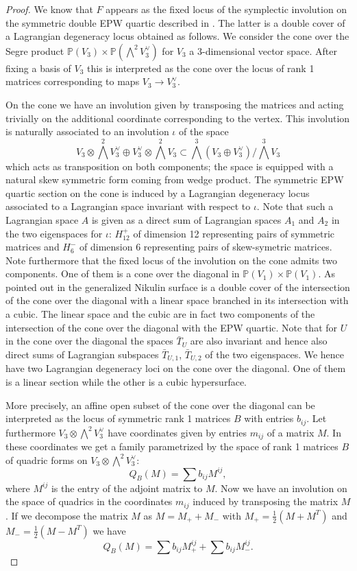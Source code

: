 \documentclass{amsart}
\theoremstyle{definition}
\numberwithin{equation}{section}
\numberwithin{equation}{section} \theoremstyle{definition}
\begin{document}
\begin{proof}
    We know that $F$ appears as the fixed locus of the symplectic involution on the symmetric double EPW quartic described in \cite[Section 5A]{CGKK}. The latter is a double cover of a Lagrangian degeneracy locus obtained as follows. We consider the cone over the Segre product $\mathbb P(V_3)\times \mathbb P(\bigwedge^2 V_3^\vee)$ for $V_3$ a $3$-dimensional vector space.  After fixing a basis of $V_3$ this is interpreted as the cone over the locus of rank 1 matrices corresponding to maps $V_3\to V_3^{\vee}$. %
    
    On the cone we have an involution given by transposing the matrices and acting trivially on the additional coordinate corresponding to the vertex. This involution is naturally associated to an involution $\iota$ of the space $$V_3\otimes \bigwedge^2 V_3^{\vee}\oplus V_3^{\vee}\otimes \bigwedge^2 V_3\subset \bigwedge^3 (V_3\oplus V_3^{\vee})/\bigwedge^3 V_3$$ which acts as transposition on both components; the space is equipped with a natural skew symmetric form coming from wedge product. 
    The symmetric EPW quartic section on the cone is induced by a Lagrangian degeneracy locus associated to a Lagrangian space invariant with respect to $\iota$. Note that such a Lagrangian space $A$ is given as a direct sum of Lagrangian spaces $A_1$ and $A_2$ in the two eigenspaces for $\iota$: $H^+_{12}$ of dimension 12 representing pairs of symmetric matrices and  $H^-_6$ of dimension 6 representing pairs of skew-symetric matrices. Note furthermore that the fixed locus of the involution on the cone  admits two components. 
    One of them is a cone over the diagonal in $\mathbb P(V_1)\times \mathbb P(V_1)$. As pointed out in \cite[Proposition 5.3]{CGKK} the generalized Nikulin surface is a double cover of the intersection of the cone over the diagonal with a linear space branched in its intersection with a cubic. The linear space and the cubic are in fact two components of the intersection of the cone over the diagonal with the EPW quartic. 
    Note that for $U$ in the cone over the diagonal the spaces $\bar T_U$ are also invariant and hence also direct sums of Lagrangian subspaces $\bar T_{U,1}$, $\bar T_{U,2}$  of the two eigenspaces. We hence have two Lagrangian degeneracy loci on the cone over the diagonal. One of them is a linear section while the other is a cubic hypersurface. 
    
    
    More precisely, an affine open subset of the cone over the diagonal can be interpreted as the locus of symmetric rank 1 matrices $B$ with entries $b_{ij}$.  Let furthermore $V_3\otimes \bigwedge^2 V_3^{\vee}$ have coordinates given by entries $m_{ij}$ of a matrix $M$.  
   In these coordinates we get a family parametrized by the space of rank 1 matrices $B$ of quadric forms on $V_3\otimes \bigwedge^2 V_3^{\vee}$:
   $$Q_B(M)=\sum b_{ij} M^{ij},$$ where $M^{ij}$ is the entry of the adjoint matrix to $M$. Now we have an  involution on the space of quadrics in the coordinates $m_{ij}$ induced by transposing the matrix $M$. If we decompose the matrix $M$ as $M=M_++M_-$ with $M_+=\frac{1}{2}(M+M^T)$ and $M_-=\frac{1}{2}(M-M^T)$
   we have 
   $$Q_B(M)=\sum b_{ij} M_+^{ij} + \sum b_{ij} M_-^{ij}.$$
   

\end{proof}
\end{document}
